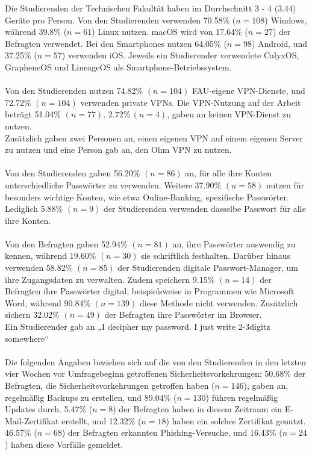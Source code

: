 \documentclass[german,report]{i1thesis}
\begin{document}
Die Studierenden der Technischen Fakultät haben im Durchschnitt 3 - 4 (\(3.44\)) Geräte pro Person. Von den Studierenden verwenden 70.58\% (\(n = 108\)) Windows, während 39.8\% (\(n = 61\)) Linux nutzen. macOS wird von 17.64\% (\(n = 27\)) der Befragten verwendet. Bei den Smartphones nutzen 64.05\% (\(n = 98\)) Android, und 37.25\% (\(n = 57\)) verwenden iOS. Jeweils ein Studierender verwendete CalyxOS, GrapheneOS und LineageOS als Smartphone-Betriebssystem.\\
\\
Von den Studierenden nutzen 74.82\% \((n = 104)\) FAU-eigene VPN-Dienste, und 72.72\% \((n = 104)\) verwenden private VPNs. Die VPN-Nutzung auf der Arbeit beträgt 51.04\% \((n = 77)\). \(2.72\% \,(n = 4)\), gaben an keinen VPN-Dienst zu nutzen.\\
Zusätzlich gaben zwei Personen an, einen eigenen VPN auf einem eigenen Server zu nutzen und eine Person gab an, den Ohm VPN zu nutzen.\\
\\
Von den Studierenden gaben 56.20\% \((n=86)\) an, für alle ihre Konten unterschiedliche Passwörter zu verwenden. Weitere 37.90\% \((n=58)\) nutzen für besonders wichtige Konten, wie etwa Online-Banking, spezifische Passwörter. Lediglich 5.88\% \((n=9)\) der Studierenden verwenden dasselbe Passwort für alle ihre Konten.\\
\\
Von den Befragten gaben 52.94\% \((n=81)\) an, ihre Passwörter auswendig zu kennen, während 19.60\% \((n=30)\) sie schriftlich festhalten. Darüber hinaus verwenden 58.82\% \((n=85)\) der Studierenden digitale Passwort-Manager, um ihre Zugangsdaten zu verwalten. Zudem speichern 9.15\% \((n=14)\) der Befragten ihre Passwörter digital, beispielsweise in Programmen wie Microsoft Word, während 90.84\% \((n=139)\) diese Methode nicht verwenden. Zusätzlich sichern 32.02\% \((n=49)\) der Befragten ihre Passwörter im Browser.\\
Ein Studierender gab an „I decipher my password. I just write 2-3digitz somewhere“\\
\\
Die folgenden Angaben beziehen sich auf die von den Studierenden in den letzten vier Wochen vor Umfragebeginn getroffenen Sicherheitsvorkehrungen: 50.68\% der Befragten, die Sicherheitsvorkehrungen getroffen haben (\(n = 146\)), gaben an, regelmäßig Backups zu erstellen, und 89.04\% (\(n = 130\)) führen regelmäßig Updates durch. 5.47\% (\(n = 8\)) der Befragten haben in diesem Zeitraum ein E-Mail-Zertifikat erstellt, und 12.32\% (\(n = 18\)) haben ein solches Zertifikat genutzt. 46.57\% (\(n = 68\)) der Befragten erkannten Phishing-Versuche, und 16.43\% (\(n = 24\)) haben diese Vorfälle gemeldet.\\
\end{document}
